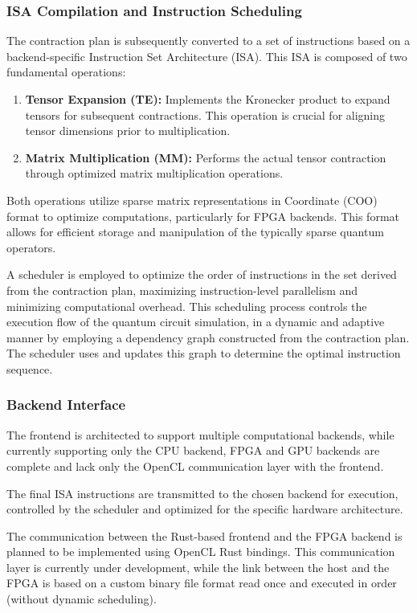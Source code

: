 \documentclass[12pt,oneside,a4paper]{article}
\begin{document}
\subsubsection{ISA Compilation and Instruction Scheduling}

The contraction plan is subsequently converted to a set of instructions based on a backend-specific Instruction Set Architecture (ISA). This ISA is composed of two fundamental operations:

\begin{enumerate}
    \item \textbf{Tensor Expansion (TE):} Implements the Kronecker product to expand tensors for subsequent contractions. This operation is crucial for aligning tensor dimensions prior to multiplication.
    \item \textbf{Matrix Multiplication (MM):} Performs the actual tensor contraction through optimized matrix multiplication operations.
\end{enumerate}

Both operations utilize sparse matrix representations in Coordinate (COO) format to optimize computations, particularly for FPGA backends. This format allows for efficient storage and manipulation of the typically sparse quantum operators.

A scheduler is employed to optimize the order of instructions in the set derived from the contraction plan, maximizing instruction-level parallelism and minimizing computational overhead. This scheduling process controls the execution flow of the quantum circuit simulation, in a dynamic and adaptive manner by employing a dependency graph constructed from the contraction plan. The scheduler uses and updates this graph to determine the optimal instruction sequence.

\subsubsection{Backend Interface}

The frontend is architected to support multiple computational backends, while currently supporting only the CPU backend, FPGA and GPU backends are complete and lack only the OpenCL communication layer with the frontend.

The final ISA instructions are transmitted to the chosen backend for execution, controlled by the scheduler and optimized for the specific hardware architecture.

The communication between the Rust-based frontend and the FPGA backend is planned to be implemented using OpenCL Rust bindings. This communication layer is currently under development, while the link between the host and the FPGA is based on a custom binary file format read once and executed in order (without dynamic scheduling).
\end{document}
